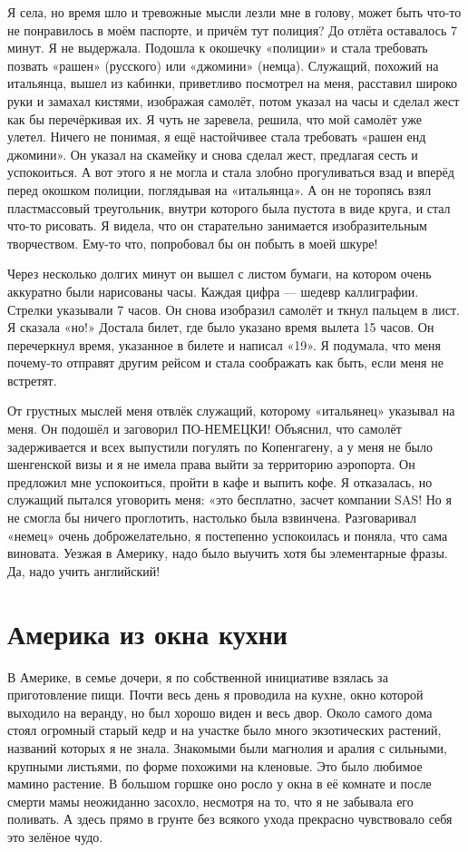 Я села, но время шло и тревожные мысли лезли мне в голову, может быть что-то не понравилось в моём паспорте, и причём тут полиция? 
До отлёта оставалось 7 минут.
Я не выдержала.
Подошла к окошечку «полиции» и стала требовать позвать «рашен» (русского) или «джомини» (немца).
Служащий, похожий на итальянца, вышел из кабинки, приветливо посмотрел на меня, расставил широко руки и замахал кистями, изображая самолёт, потом указал на часы и сделал жест как бы перечёркивая их.
Я чуть не заревела, решила, что мой самолёт уже улетел.
Ничего не понимая, я ещё настойчивее стала требовать «рашен енд джомини».
Он указал на скамейку и снова сделал жест, предлагая сесть и успокоиться.
А вот этого я не могла и стала злобно прогуливаться взад и вперёд перед окошком полиции, поглядывая на «итальянца».
А он не торопясь взял пластмассовый треугольник, внутри которого была пустота в виде круга, и стал что-то рисовать.
Я видела, что он старательно занимается изобразительным творчеством.
Ему-то что, попробовал бы он побыть в моей шкуре!

Через несколько долгих минут он вышел с листом бумаги, на котором очень аккуратно были нарисованы часы.
Каждая цифра --- шедевр каллиграфии.
Стрелки указывали 7 часов.
Он снова изобразил самолёт и ткнул пальцем в лист.
Я сказала «но!» 
Достала билет, где было указано время вылета 15 часов.
Он перечеркнул время, указанное в билете и написал «19».
Я подумала, что меня почему-то отправят другим рейсом и стала соображать как быть, если меня не встретят.

От грустных мыслей меня отвлёк служащий, которому «итальянец» указывал на меня.
Он подошёл и заговорил ПО-НЕМЕЦКИ! 
Объяснил, что самолёт задерживается и всех выпустили погулять по Копенгагену, а у меня не было шенгенской визы и я не имела права выйти за территорию аэропорта.
Он предложил мне успокоиться, пройти в кафе и выпить кофе.
Я отказалась, но служащий пытался уговорить меня: 
«это бесплатно, засчет компании SAS! 
Но я не смогла бы ничего проглотить, настолько была взвинчена.
Разговаривал «немец» очень доброжелательно, я постепенно успокоилась и поняла, что сама виновата.
Уезжая в Америку, надо было выучить хотя бы элементарные фразы.
Да, надо учить английский!

\section*{Америка из окна кухни}

В Америке, в семье дочери, я по собственной инициативе взялась за приготовление пищи.
Почти весь день я проводила на кухне, окно которой выходило на веранду, но был хорошо виден и весь двор.
Около самого дома стоял огромный старый кедр и на участке было много экзотических растений, названий которых я не знала.
Знакомыми были магнолия и аралия с сильными, крупными листьями, по форме похожими на кленовые.
Это было любимое мамино растение.
В большом горшке оно росло у окна в её комнате и после смерти мамы неожиданно засохло, несмотря на то, что я не забывала его поливать.
А здесь прямо в грунте без всякого ухода прекрасно чувствовало себя это зелёное чудо.

